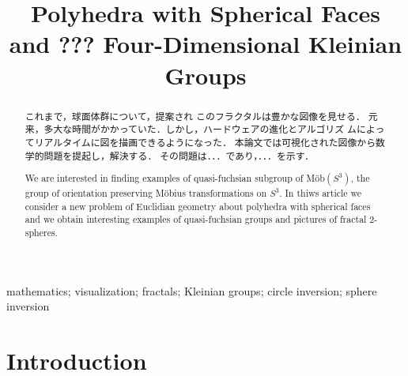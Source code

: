 \documentclass[dvipdfmx]{interact}
\theoremstyle{plain}%
\theoremstyle{definition}
\theoremstyle{remark}
\theoremstyle{problemstyle}
\begin{document}

\title{Polyhedra with Spherical Faces and ??? Four-Dimensional Kleinian Groups}

\author{
}

\maketitle

\begin{abstract}
 これまで，球面体群について，提案され
 このフラクタルは豊かな図像を見せる．
 元来，多大な時間がかかっていた．しかし，ハードウェアの進化とアルゴリズ
 ムによってリアルタイムに図を描画できるようになった．
 本論文では可視化された図像から数学的問題を提起し，解決する．
 その問題は．．．であり，．．．を示す．

 We are interested in finding examples of quasi-fuchsian subgroup of
 M\"ob$(S^3)$, the group of orientation preserving M\"obius
 transformations on $S^3$. In thiws article we consider a new problem of
 Euclidian geometry about polyhedra with spherical faces and we obtain
 interesting examples of quasi-fuchsian groups and pictures of fractal
 2-spheres.
\end{abstract}

\begin{keywords}
mathematics; visualization; fractals; Kleinian groups; circle inversion;
 sphere inversion
\end{keywords}

\section{Introduction}
\end{document}
